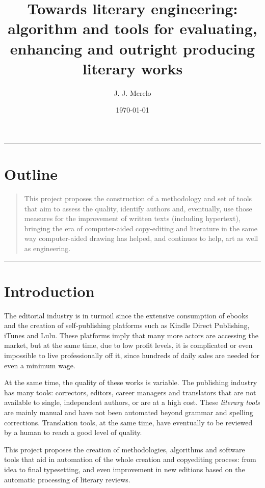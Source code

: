 \documentclass[a4paper]{article}
\title{Towards literary engineering: algorithm and tools for
  evaluating, enhancing and outright producing literary works}
\author{J. J. Merelo}
\date{\today}
\begin{document}
\maketitle

\smallskip
\hrule height 1pt 

\section*{Outline}
\begin{quote}
This project proposes the construction of a methodology and
  set of tools that aim to assess the quality, identify authors and,
  eventually, use those measures for the improvement of written texts
  (including hypertext), bringing the era of computer-aided
  copy-editing and literature in the same way computer-aided drawing
  has helped, and continues to help, art as well as engineering.
\end{quote}
\rule{\textwidth}{1pt}

\section{Introduction}

The editorial industry is in turmoil since the extensive consumption
of ebooks and the creation of self-publishing platforms such as Kindle
Direct Publishing, iTunes and Lulu. These platforms imply that many more actors are accessing the market, but at the same time, due to low profit levels, it is complicated or even impossible to live professionally off it, since hundreds of daily sales are needed for even a minimum wage.

At the same time, the quality of these works is variable. The
publishing industry has many tools: correctors, editors, career
managers and translators that are not available to single, independent
authors, or are at a high cost. These {\em literary tools} are mainly manual and have not been
automated beyond grammar and spelling corrections. Translation tools,
at the same time, have eventually to be reviewed by a human to reach a
good level of quality. 

This project proposes the creation of methodologies, algorithms and
software tools that aid in automation of the whole creation and
copyediting process:
from idea to final typesetting, and even improvement in new editions
based on the automatic processing of literary reviews. 
\end{document}
